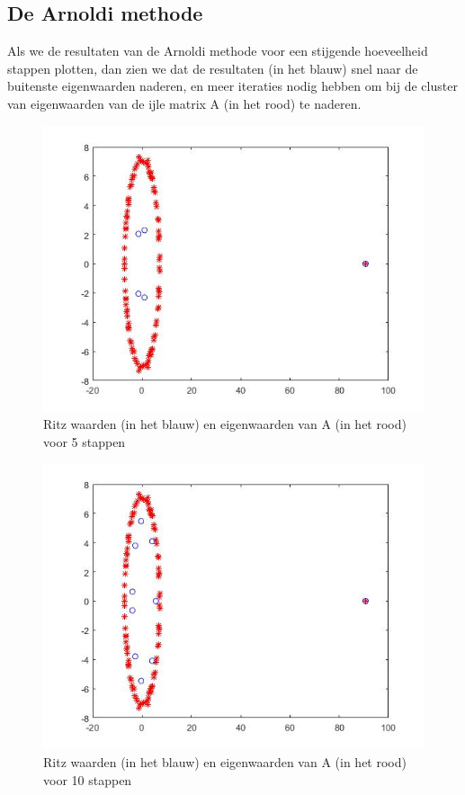 \documentclass[a4paper]{article}
\begin{document}
\subsection{De Arnoldi methode}
Als we de resultaten van de Arnoldi methode voor een stijgende hoeveelheid stappen plotten, dan zien we dat de resultaten (in het blauw) snel naar de buitenste eigenwaarden naderen, en meer iteraties nodig hebben om bij de cluster van eigenwaarden van de ijle matrix A (in het rood) te naderen.
\begin{figure}
\caption{Ritz waarden (in het blauw) en eigenwaarden van A (in het rood) voor 5 stappen}
\includegraphics[width=\textwidth, height=0.3\textheight]{RITZ5.JPG}
\end{figure}
\begin{figure}
\caption{Ritz waarden (in het blauw) en eigenwaarden van A (in het rood) voor 10 stappen}
\includegraphics[width=\textwidth, height=0.3\textheight]{RITZ10.JPG}
\end{figure}
\end{document}
